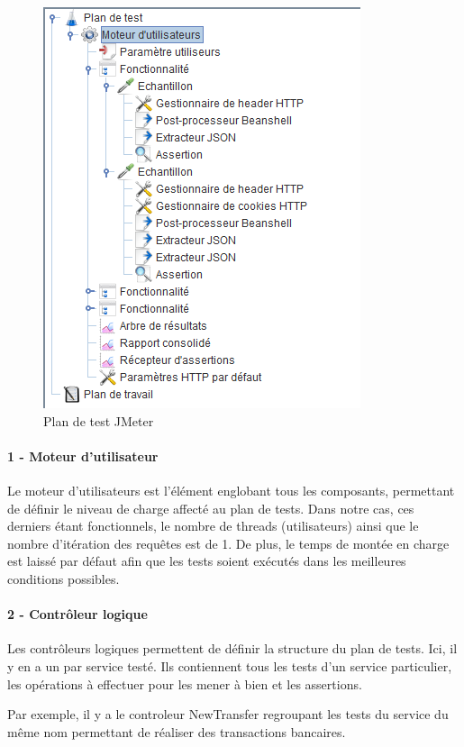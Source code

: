 	\begin{figure}[h!]
		\includegraphics[scale=0.7]{images/travailNeuflizeOBC/testsFonc/jmeterPlanTest.png}
		\centering
		\caption{Plan de test JMeter}
		\label{jmeterPlanTest}
	\end{figure}
	
	\paragraph{1 - Moteur d'utilisateur}
	Le moteur d'utilisateurs est l'élément englobant tous les composants, permettant de définir le niveau de charge affecté au plan de tests. Dans notre cas, ces derniers étant fonctionnels, le nombre de threads (utilisateurs) ainsi que le nombre d'itération des requêtes est de 1. De plus, le temps de montée en charge est laissé par défaut afin que les tests soient exécutés dans les meilleures conditions possibles.

	\paragraph{2 - Contrôleur logique}
	Les contrôleurs logiques permettent de définir la structure du plan de tests. Ici, il y en a un par service testé. Ils contiennent tous les tests d'un service particulier, les opérations à effectuer pour les mener à bien et les assertions.
	
	Par exemple, il y a le controleur NewTransfer regroupant les tests du service du même nom permettant de réaliser des transactions bancaires.
	
